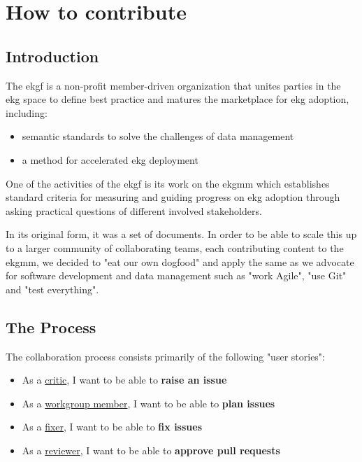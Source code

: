 \chapter{How to contribute}

\section{Introduction}

The \gls{ekgf} is a non-profit member-driven organization that unites parties
in the \gls{ekg} space to define best practice and matures the marketplace for
\gls{ekg} adoption, including:

\begin{itemize}
    \item semantic standards to solve the challenges of data management 
    \item a method for accelerated \gls{ekg} deployment
\end{itemize}

One of the activities of the \gls{ekgf} is its work on the \gls{ekgmm}
which establishes standard criteria for measuring and guiding progress
on \gls{ekg} adoption through asking practical questions of different
involved stakeholders. 

In its original form, it was a set of documents.
In order to be able to scale this up to a larger community of collaborating teams, 
each contributing content to the \gls{ekgmm}, we decided to "eat our own dogfood" 
and apply the same  as we advocate for software development and
data management such as "work Agile", "use Git"
and "test everything".

\section{The Process}

The collaboration process consists primarily of the following "user stories":

\begin{tcolorbox}[colback=secondary!5,colframe=secondary!80,title=\textbf{User Stories}]
    \begin{itemize}[leftmargin=1em]
        \item As a \underline{critic}, I want to be able to \textbf{raise an issue}
        \item As a \underline{workgroup member}, I want to be able to \textbf{plan issues}
        \item As a \underline{fixer}, I want to be able to \textbf{fix issues}
        \item As a \underline{reviewer}, I want to be able to \textbf{approve pull requests}
    \end{itemize}
\end{tcolorbox}


